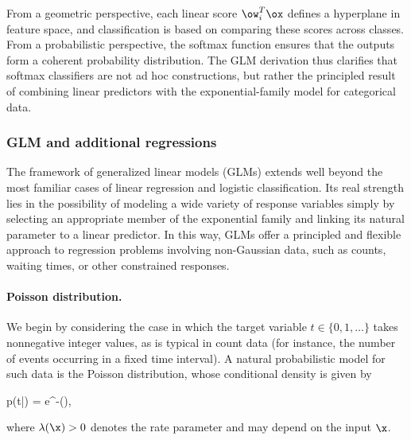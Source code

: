 \medskip
From a geometric perspective, each linear score $\ow_i^{T}\ox$ defines a hyperplane in feature space, and classification is based on comparing these scores across classes. From a probabilistic perspective, the softmax function ensures that the outputs form a coherent probability distribution. The GLM derivation thus clarifies that softmax classifiers are not ad hoc constructions, but rather the principled result of combining linear predictors with the exponential-family model for categorical data.


\subsubsection*{GLM and additional regressions}

The framework of generalized linear models (GLMs) extends well beyond the most familiar cases of linear regression and logistic classification. Its real strength lies in the possibility of modeling a wide variety of response variables simply by selecting an appropriate member of the exponential family and linking its natural parameter to a linear predictor. In this way, GLMs offer a principled and flexible approach to regression problems involving non-Gaussian data, such as counts, waiting times, or other constrained responses.

\paragraph*{Poisson distribution.}
We begin by considering the case in which the target variable $t \in \{0,1,\ldots\}$ takes nonnegative integer values, as is typical in count data (for instance, the number of events occurring in a fixed time interval). A natural probabilistic model for such data is the Poisson distribution, whose conditional density is given by
\begin{myequation}
p(t|\x) =  e^{-\lambda(\x)},
\end{myequation}
where $\lambda(\x) > 0$ denotes the rate parameter and may depend on the input $\x$.

